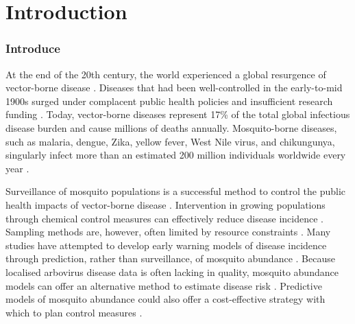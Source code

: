 \section{Introduction}
\setcounter{page}{1}

\subsubsection{Introduce}

At the end of the 20th century, the world experienced a global resurgence of vector-borne disease \citep{Gubler}. Diseases that had been well-controlled in the early-to-mid 1900s surged under complacent public health policies and insufficient research funding \citep{Gubler1998}. %
Today, vector-borne diseases represent 17\% of the total global infectious disease burden and cause millions of deaths annually. Mosquito-borne diseases, such as malaria, dengue, Zika, yellow fever, West Nile virus, and chikungunya, singularly infect more than an estimated 200 million individuals worldwide every year \citep{WHOreport}. 

Surveillance of mosquito populations is a successful method to control the public health impacts of vector-borne disease \citep{Vazquez-Prokopec2010}. Intervention in growing populations through chemical control measures can effectively reduce disease incidence \citep{Tomerini2011}. Sampling methods are, however, often limited by resource constraints \citep{Sedda2019}. Many studies have attempted to develop early warning models of disease incidence through prediction, rather than surveillance, of mosquito abundance \citep{Beck-Johnson2013, Li2019, Poh2019}. Because localised arbovirus disease data is often lacking in quality, mosquito abundance models can offer an alternative method to estimate disease risk \citep{Lowe2013}. Predictive models of mosquito abundance could also offer a cost-effective strategy with which to plan control measures \citep{Yang2009}.  

